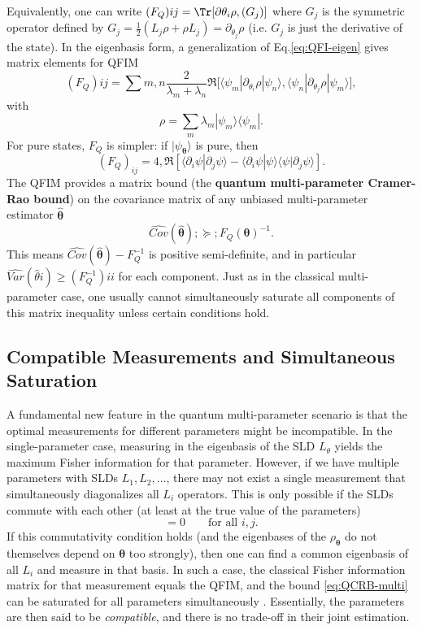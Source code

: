 Equivalently, one can write $(F_Q){ij} = \Tr[\partial{\theta_i}\rho, (G_j)]$ where $G_j$ is the symmetric operator defined by $G_j = \frac{1}{2}(L_j \rho + \rho L_j) = \partial_{\theta_j}\rho$ (i.e. $G_j$ is just the derivative of the state). In the eigenbasis form, a generalization of Eq.\eqref{eq:QFI-eigen} gives matrix elements for QFIM
\begin{equation}
(F_Q){ij} = \sum{m,n} \frac{2}{\lambda_m + \lambda_n} \Re\big[\langle \psi_m|\partial_{\theta_i}\rho|\psi_n\rangle, \langle \psi_n|\partial_{\theta_j}\rho|\psi_m\rangle\big],
\end{equation}
with
\[
\rho = \sum_m \lambda_m |\psi_m\rangle\langle \psi_m|.
\]
For pure states, $F_Q$ is simpler: if $|\psi_{\bm{\theta}}\rangle$ is pure, then
\[
(F_Q)_{ij} = 4,\Re[\langle \partial_i \psi | \partial_j \psi \rangle - \langle \partial_i \psi|\psi\rangle\langle\psi|\partial_j \psi\rangle].
\]
The QFIM provides a matrix bound (the \textbf{quantum multi-parameter Cramer-Rao bound}) on the covariance matrix of any unbiased
multi-parameter estimator $\hat{\bm{\theta}}$
\begin{equation}
\widehat{Cov}(\hat{\bm{\theta}}) ;\succeq; F_Q(\bm{\theta})^{-1}.
\label{eq:QCRB-multi}
\end{equation}
This means $ \widehat{Cov}(\hat{\bm{\theta}}) - F_Q^{-1}$ is positive
semi-definite, and in particular $\widehat{Var}(\hat{\theta}i) \ge
(F_Q^{-1}){ii}$ for each component. Just as in the classical
multi-parameter case, one usually cannot simultaneously saturate all
components of this matrix inequality unless certain conditions hold.



\subsection{Compatible Measurements and Simultaneous Saturation}

A fundamental new feature in the quantum multi-parameter scenario is
that the optimal measurements for different parameters might be
incompatible. In the single-parameter case, measuring in the
eigenbasis of the SLD $L_\theta$ yields the maximum Fisher information
for that parameter. However, if we have multiple parameters with SLDs
$L_1, L_2, \ldots$, there may not exist a single measurement that
simultaneously diagonalizes all $L_i$ operators. This is only possible
if the SLDs commute with each other (at least at the true value of the
parameters)
\begin{equation}
[L_i, L_j] = 0 \qquad \text{for all } i,j.
\label{eq:SLD-comm}
\end{equation}
If this commutativity condition holds (and the eigenbases of the
$\rho_{\bm{\theta}}$ do not themselves depend on $\bm{\theta}$ too
strongly), then one can find a common eigenbasis of all $L_i$ and
measure in that basis. In such a case, the classical Fisher
information matrix for that measurement equals the QFIM, and the bound
\eqref{eq:QCRB-multi} can be saturated for all parameters
simultaneously \cite{Ragy2016}. Essentially, the parameters are then
said to be \textit{compatible}, and there is no trade-off in their
joint estimation.



